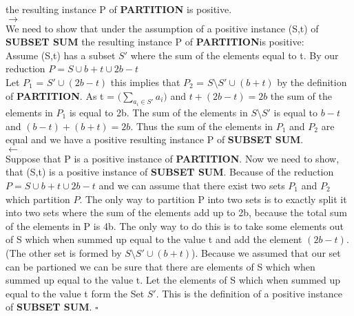 \documentclass [11pt]{article}
\begin{document}
{ the resulting instance P of \textbf{PARTITION} is positive.\\
 $\rightarrow$\\
 We need to show that under the assumption of a positive instance (S,t) of \textbf{SUBSET SUM} the resulting instance P of \textbf{PARTITION}is positive:\\
 Assume (S,t) has a subset $S'$ where the sum of the elements equal to t. By our reduction  $P = S \cup b+t \cup 2b-t$ \\
 Let $P_1$ = $S' \cup (2b-t)$ this implies that $P_2$ = $S \setminus S' \cup (b+t)$ by the definition of \textbf{PARTITION}. As t = $\big(\sum_{a_i \in S'} a_i \big) $ and $t+(2b-t)=2b$ the sum of the elements in 
 $P_1$ is equal to 2b. The sum of the elements in $S \setminus S'$ is equal to $b-t$ and  $(b-t) +(b+t) = 2b$. Thus the sum of the elements in 
 $P_1$ and $P_2$ are equal and we have a positive resulting instance P of \textbf{SUBSET SUM}.\\
 $\leftarrow$\\
 Suppose that P is a positive instance of \textbf{PARTITION}. Now we need to show, that (S,t) is a positive instance of \textbf{SUBSET SUM}.
 Because of the reduction $P = S \cup b+t \cup 2b-t$ and we can assume that there exist two sets $P_1$ and $P_2$ which partition $P$.
 The only way to partition P into two sets is to exactly split it into two sets where the sum of the elements add up to 2b, because the total sum of the elements in P is 4b.
 The only way to do this is to take some elements out of S which when summed up equal to the value t and add the element $(2b-t)$. (The other set is formed by $S \setminus S' \cup (b+t)$).
 Because we assumed that our set can be partioned we can be sure that there are elements of S which when summed up equal to the value t.
 Let the elements of S which when summed up equal to the value t form the Set $S'$. This is the definition of a positive instance of \textbf{SUBSET SUM}.
$\square$
}
\newpage
\end{document}
